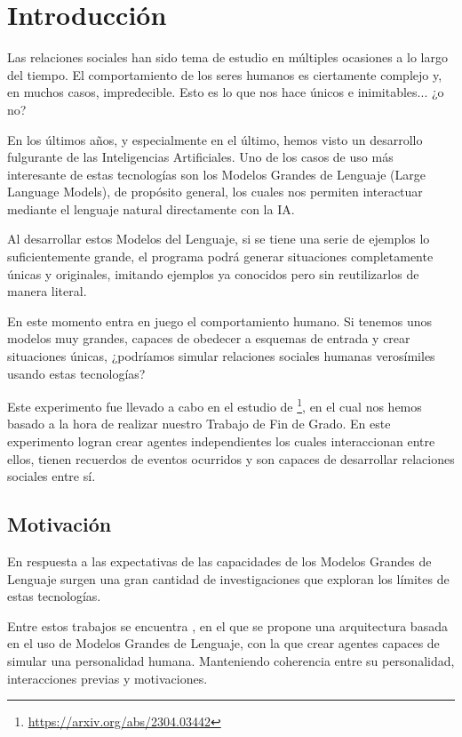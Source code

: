 \chapter{Introducción}
\label{cap:introduccion}


Las relaciones sociales han sido tema de estudio en múltiples ocasiones a lo largo del tiempo. El comportamiento de los seres humanos es ciertamente complejo y, en muchos casos, impredecible. Esto es lo que nos hace únicos e inimitables... ¿o no?

En los últimos años, y especialmente en el último, hemos visto un desarrollo fulgurante de las Inteligencias Artificiales. Uno de los casos de uso más interesante de estas tecnologías son los Modelos Grandes de Lenguaje (Large Language Models), de propósito general, los cuales nos permiten interactuar mediante el lenguaje natural directamente con la IA.

Al desarrollar estos Modelos del Lenguaje, si se tiene una serie de ejemplos lo suficientemente grande, el programa podrá generar situaciones completamente únicas y originales, imitando ejemplos ya conocidos pero sin reutilizarlos de manera literal.

En este momento entra en juego el comportamiento humano. Si tenemos unos modelos muy grandes, capaces de obedecer a esquemas de entrada y crear situaciones únicas, ¿podríamos simular relaciones sociales humanas verosímiles usando estas tecnologías?

Este experimento fue llevado a cabo en el estudio de \ga\footnote{\url{https://arxiv.org/abs/2304.03442}}, en el cual nos hemos basado a la hora de realizar nuestro Trabajo de Fin de Grado. En este experimento logran crear agentes independientes los cuales interaccionan entre ellos, tienen recuerdos de eventos ocurridos y son capaces de desarrollar relaciones sociales entre sí.

\section{Motivación}
En respuesta a las expectativas de las capacidades de los Modelos Grandes de Lenguaje surgen una gran cantidad de investigaciones que exploran los límites de estas tecnologías.

Entre estos trabajos se encuentra \ga, en el que se propone una arquitectura basada en el uso de Modelos Grandes de Lenguaje, con la que crear agentes capaces de simular una personalidad humana. Manteniendo coherencia entre su personalidad, interacciones previas y motivaciones.

